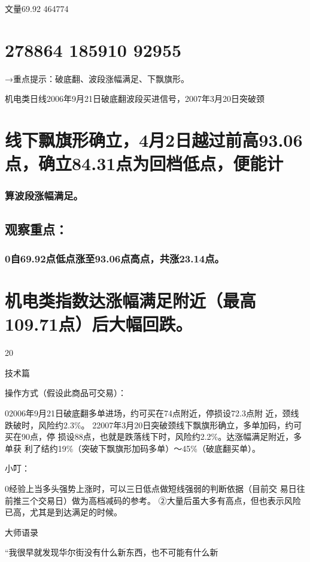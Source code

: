 \documentclass{article}
\begin{document}
文量69.92 464774

\section{278864 185910 92955}

→重点提示：破底翻、波段涨幅满足、下飘旗形。

机电类日线2006年9月21日破底翻波段买进信号，2007年3月20日突破颈

\section{线下飘旗形确立，4月2日越过前高93.06点，确立84.31点为回档低点，便能计}

\subsubsection{算波段涨幅满足。}

\subsection{观察重点：}

\subsubsection{0自69.92点低点涨至93.06点高点，共涨23.14点。}

\section{机电类指数达涨幅满足附近（最高109.71点）后大幅回跌。}

20

\clearpage

技术篇

操作方式（假设此商品可交易）：

02006年9月21日破底翻多单进场，约可买在74点附近，停损设72.3点附 近，颈线跌破时，风险约2.3\%。 22007年3月20日突破颈线下飘旗形确立，多单加码，约可买在90点，停 损设88点，也就是跌落线下时，风险约2.2\%。达涨幅满足附近，多单获 利了结约19\%（突破下飘旗形加码多单）～45\%（破底翻买单）。

小叮：

0经验上当多头强势上涨时，可以三日低点做短线强弱的判断依据（目前交 易日往前推三个交易日）做为高档减码的参考。 ②大量后虽大多有高点，但也表示风险已高，尤其是到达满足的时候。

大师语录

“我很早就发现华尔街没有什么新东西，也不可能有什么新
\end{document}
